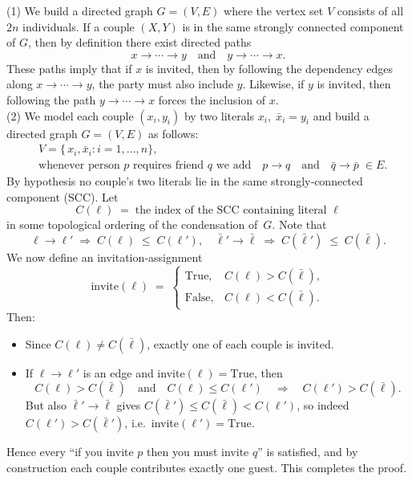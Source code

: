 \documentclass[letterpaper, 11pt]{article}
\newcommand{\1}{\mathds{1}}	%
\theoremstyle{definition}
\newenvironment{solution}{{\par\noindent\it Solution.}}{}
\begin{document}
\begin{solution}
(1) We build a directed graph \( G = (V, E) \) where the vertex set \( V \) consists of all \( 2n \) individuals. If a couple $(X,Y)$ is in the same strongly connected component of $G$, then by definition there exist directed paths
\[
x \rightarrow \cdots \rightarrow y \quad \text{and} \quad y \rightarrow \cdots \rightarrow x.
\]
These paths imply that if \( x \) is invited, then by following the dependency edges along \( x \rightarrow \cdots \rightarrow y \), the party must also include \( y \). Likewise, if \( y \) is invited, then following the path \( y \rightarrow \cdots \rightarrow x \) forces the inclusion of \( x \).
\\(2)
We model each couple $(x_i,y_i)$ by two literals $x_i,\;\bar x_i=y_i$ and build a directed graph $G=(V,E)$ as follows:
\begin{align*}
&V=\{\,x_i,\bar x_i: i=1,\dots,n\},\\
&\text{whenever person }p\text{ requires friend }q\text{ we add}
  \quad p\to q\quad\text{and}\quad \bar q\to\bar p
  \;\in E.
\end{align*}
By hypothesis no couple’s two literals lie in the same strongly‐connected component (SCC).  Let
\[
  C(\ell)\;=\;\text{the index of the SCC containing literal }\ell
\]
in some topological ordering of the condensation of $G$.  Note that
\[
  \ell\to\ell'\;\Longrightarrow\;C(\ell)\;\le\;C(\ell'),
  \quad
  \bar\ell'\to\bar\ell\;\Longrightarrow\;C(\bar\ell')\;\le\;C(\bar\ell).
\]
We now define an invitation‐assignment
\[
  \text{invite}(\ell)
  \;=\;
  \begin{cases}
    \mathrm{True},&C(\ell)>C(\bar\ell),\\
    \mathrm{False},&C(\ell)<C(\bar\ell).
  \end{cases}
\]
Then:
\begin{itemize}
  \item Since $C(\ell)\neq C(\bar\ell)$, exactly one of each couple is invited.
  \item If $\ell\to\ell'$ is an edge and invite$(\ell)=\mathrm{True}$, then
    \[
      C(\ell)>C(\bar\ell)
      \quad\text{and}\quad
      C(\ell)\le C(\ell')
      \quad\Longrightarrow\quad
      C(\ell')>C(\bar\ell).
    \]
    But also $\bar\ell'\to\bar\ell$ gives 
    $C(\bar\ell')\le C(\bar\ell)<C(\ell')$, 
    so indeed $C(\ell')>C(\bar\ell')$, i.e.\ invite$(\ell')=\mathrm{True}$.
\end{itemize}
Hence every “if you invite $p$ then you must invite $q$” is satisfied, and by construction each couple contributes exactly one guest.  This completes the proof.

\end{solution}
\end{document}
